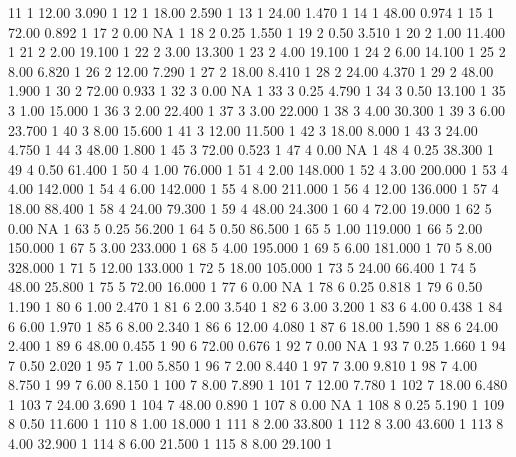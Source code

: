 \begin{Schunk}
\begin{Soutput}
11     1 12.00   3.090   1
12     1 18.00   2.590   1
13     1 24.00   1.470   1
14     1 48.00   0.974   1
15     1 72.00   0.892   1
17     2  0.00      NA   1
18     2  0.25   1.550   1
19     2  0.50   3.510   1
20     2  1.00  11.400   1
21     2  2.00  19.100   1
22     2  3.00  13.300   1
23     2  4.00  19.100   1
24     2  6.00  14.100   1
25     2  8.00   6.820   1
26     2 12.00   7.290   1
27     2 18.00   8.410   1
28     2 24.00   4.370   1
29     2 48.00   1.900   1
30     2 72.00   0.933   1
32     3  0.00      NA   1
33     3  0.25   4.790   1
34     3  0.50  13.100   1
35     3  1.00  15.000   1
36     3  2.00  22.400   1
37     3  3.00  22.000   1
38     3  4.00  30.300   1
39     3  6.00  23.700   1
40     3  8.00  15.600   1
41     3 12.00  11.500   1
42     3 18.00   8.000   1
43     3 24.00   4.750   1
44     3 48.00   1.800   1
45     3 72.00   0.523   1
47     4  0.00      NA   1
48     4  0.25  38.300   1
49     4  0.50  61.400   1
50     4  1.00  76.000   1
51     4  2.00 148.000   1
52     4  3.00 200.000   1
53     4  4.00 142.000   1
54     4  6.00 142.000   1
55     4  8.00 211.000   1
56     4 12.00 136.000   1
57     4 18.00  88.400   1
58     4 24.00  79.300   1
59     4 48.00  24.300   1
60     4 72.00  19.000   1
62     5  0.00      NA   1
63     5  0.25  56.200   1
64     5  0.50  86.500   1
65     5  1.00 119.000   1
66     5  2.00 150.000   1
67     5  3.00 233.000   1
68     5  4.00 195.000   1
69     5  6.00 181.000   1
70     5  8.00 328.000   1
71     5 12.00 133.000   1
72     5 18.00 105.000   1
73     5 24.00  66.400   1
74     5 48.00  25.800   1
75     5 72.00  16.000   1
77     6  0.00      NA   1
78     6  0.25   0.818   1
79     6  0.50   1.190   1
80     6  1.00   2.470   1
81     6  2.00   3.540   1
82     6  3.00   3.200   1
83     6  4.00   0.438   1
84     6  6.00   1.970   1
85     6  8.00   2.340   1
86     6 12.00   4.080   1
87     6 18.00   1.590   1
88     6 24.00   2.400   1
89     6 48.00   0.455   1
90     6 72.00   0.676   1
92     7  0.00      NA   1
93     7  0.25   1.660   1
94     7  0.50   2.020   1
95     7  1.00   5.850   1
96     7  2.00   8.440   1
97     7  3.00   9.810   1
98     7  4.00   8.750   1
99     7  6.00   8.150   1
100    7  8.00   7.890   1
101    7 12.00   7.780   1
102    7 18.00   6.480   1
103    7 24.00   3.690   1
104    7 48.00   0.890   1
107    8  0.00      NA   1
108    8  0.25   5.190   1
109    8  0.50  11.600   1
110    8  1.00  18.000   1
111    8  2.00  33.800   1
112    8  3.00  43.600   1
113    8  4.00  32.900   1
114    8  6.00  21.500   1
115    8  8.00  29.100   1

\end{Soutput}
\end{Schunk}
